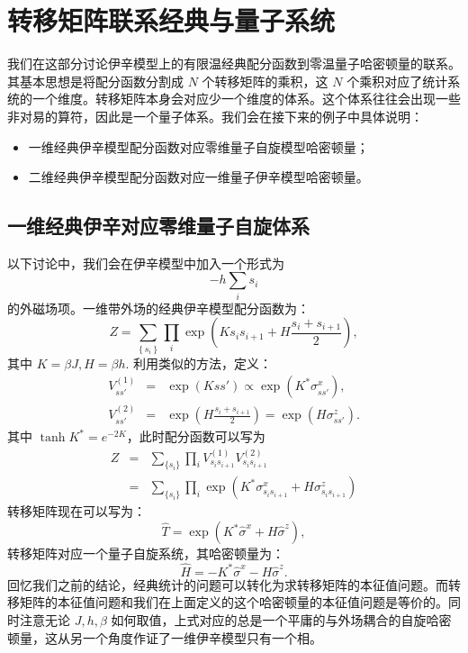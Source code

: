 \documentclass[UTF8]{ctexart}
\begin{document}
\section*{转移矩阵联系经典与量子系统}
\noindent
我们在这部分讨论伊辛模型上的有限温经典配分函数到零温量子哈密顿量的联系。其基本思想是将配分函数分割成 $N$ 个转移矩阵的乘积，这 $N$ 个乘积对应了统计系统的一个维度。转移矩阵本身会对应少一个维度的体系。这个体系往往会出现一些非对易的算符，因此是一个量子体系。我们会在接下来的例子中具体说明：
\begin{itemize}
	\item 一维经典伊辛模型配分函数对应零维量子自旋模型哈密顿量；
	\item 二维经典伊辛模型配分函数对应一维量子伊辛模型哈密顿量。
\end{itemize}
\subsection*{一维经典伊辛对应零维量子自旋体系}
\noindent
以下讨论中，我们会在伊辛模型中加入一个形式为
\begin{equation}
	-h\sum_{i}s_{i}
\end{equation} 
的外磁场项。一维带外场的经典伊辛模型配分函数为：
\begin{equation}
	Z=\sum_{\left\{ s_{i}\right\} }\prod_{i} \exp\left(Ks_{i}s_{i+1}+H \frac{s_{i}+s_{i+1}}{2}\right),
\end{equation}
其中 $K=\beta J,H=\beta h$. 利用类似的方法，定义：
\begin{eqnarray}
	V_{ss'}^{(1)} &=& \exp(Kss') \propto \exp(K^{*}\sigma^{x}_{ss'}), \\
	V_{ss'}^{(2)} &=& \exp\left(H\frac{s_i+s_{i+1}}{2}\right) = \exp(H\sigma^z_{ss'}).
\end{eqnarray}
其中 $\tanh K^{*}=e^{-2K}$，此时配分函数可以写为
\begin{eqnarray}
	Z &=& \sum_{\{s_i\}}\prod_i V^{(1)}_{s_{i}s_{i+1}} V^{(2)}_{s_{i}s_{i+1}} \\
	&=& \sum_{\{s_i\}}\prod_i \exp(K^* \sigma^x_{s_{i}s_{i+1}}+H\sigma^z_{s_{i}s_{i+1}})
\end{eqnarray}
转移矩阵现在可以写为：
\begin{equation}
	\hat T = \exp(K^* \hat\sigma^x + H \hat\sigma^z),
\end{equation}
转移矩阵对应一个量子自旋系统，其哈密顿量为：
\begin{equation}
	\hat{H}=-K^* \hat\sigma^{x}-H \hat\sigma^{z}.
\end{equation}
回忆我们之前的结论，经典统计的问题可以转化为求转移矩阵的本征值问题。而转移矩阵的本征值问题和我们在上面定义的这个哈密顿量的本征值问题是等价的。同时注意无论 $J,h,\beta$ 如何取值，上式对应的总是一个平庸的与外场耦合的自旋哈密顿量，这从另一个角度作证了一维伊辛模型只有一个相。
\end{document}
